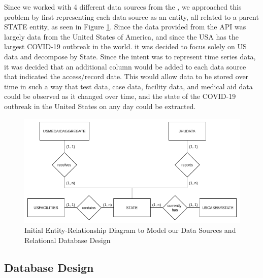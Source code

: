 \documentclass[11pt]{article}
\newcommand{\MYhref}[3][blue]{\href{#2}{\color{#1}{#3}}}%
\begin{document}
\noindent
Since we worked with 4 different data sources from the \MYhref{https://www.npmjs.com/package/covid19-api}{Covid-19 API}, we approached this problem by first representing each data source as an entity, all related to a parent STATE entity, as seen in Figure \ref{fig:er2}. Since the data provided from the API was largely data from the United States of America, and since the USA has the largest COVID-19 outbreak in the world. it was decided to focus solely on US data and decompose by State. Since the intent was to represent time series data, it was decided that an additional column would be added to each data source that indicated the access/record date. This would allow data to be stored over time in such a way that test data, case data, facility data, and medical aid data could be observed as it changed over time, and the state of the COVID-19 outbreak in the United States on any day could be extracted.

\vspace{3em}

\FloatBarrier
\begin{figure}[h]
    \centering
    \includegraphics[width=\textwidth]{diagrams/ER2.png}
    \caption{Initial Entity-Relationship Diagram to Model our Data Sources and Relational Database Design}
    \label{fig:er2}
\end{figure}
\FloatBarrier

\pagebreak

\subsection{Database Design}
\label{subsec:design}
\end{document}
